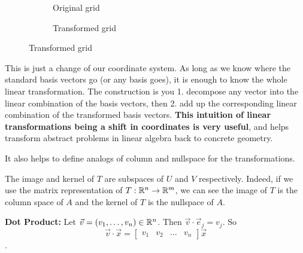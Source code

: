 \begin{figure}[h]
	\begin{subfigure}[l]{0.4\textwidth}
			\caption{Original grid}
	\end{subfigure}
	\begin{subfigure}[r]{0.6\textwidth}
			\caption{Transformed grid}
	\end{subfigure}
\end{figure}
This is just a change of our coordinate system. As long as we know where the standard basis vectors go (or any basis goes), it is enough to know the whole linear transformation. The construction is you 1. decompose any vector into the linear combination of the basis vectors, then 2. add up the corresponding linear combination of the transformed basis vectors. \textbf{This intuition of linear transformations being a shift in coordinates is very useful}, and helps transform abstract problems in linear algebra back to concrete geometry. 

It also helps to define analogs of column and nullspace for the transformations.
\begin{remark}
	The image and kernel of $T$ are subspaces of $U$ and $V$ respectively. Indeed, if we use the matrix representation of $T:\mathbb{R}^n\to\mathbb{R}^m$, we can see the image of $T$ is the column space of $A$ and the kernel of $T$ is the nullspace of $A$. 
\end{remark}
\textbf{Dot Product: }Let $\vec{v}=(v_1,\ldots,v_n)\in\mathbb{R}^n$. Then $\vec{v}\cdot\vec{e}_j=v_j$. So \[\vec{v}\cdot\vec{x} = \begin{bmatrix}
	v_1 & v_2 &  \ldots & v_n
\end{bmatrix}\vec{x}\].

